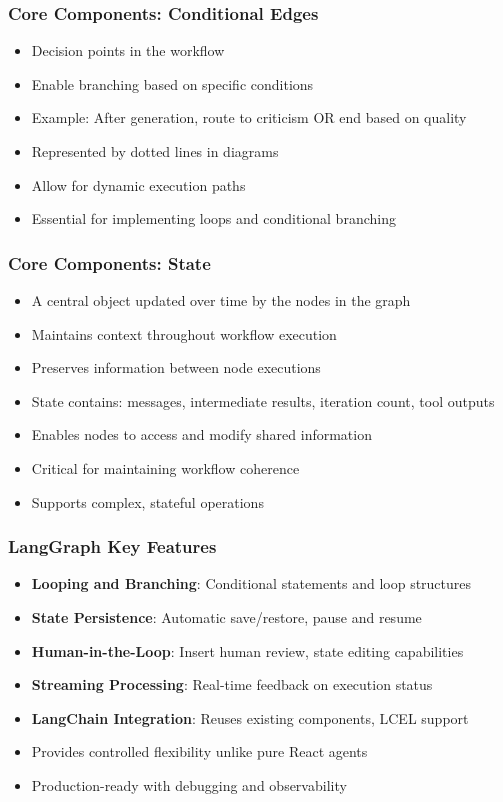 \begin{frame}[fragile]\frametitle{Core Components: Conditional Edges}
      \begin{itemize}
        \item Decision points in the workflow
        \item Enable branching based on specific conditions
        \item Example: After generation, route to criticism OR end based on quality
        \item Represented by dotted lines in diagrams
        \item Allow for dynamic execution paths
        \item Essential for implementing loops and conditional branching
      \end{itemize}
\end{frame}

\begin{frame}[fragile]\frametitle{Core Components: State}
      \begin{itemize}
	    \item A central object updated over time by the nodes in the graph
        \item Maintains context throughout workflow execution
        \item Preserves information between node executions
        \item State contains: messages, intermediate results, iteration count, tool outputs
        \item Enables nodes to access and modify shared information
        \item Critical for maintaining workflow coherence
        \item Supports complex, stateful operations
      \end{itemize}
\end{frame}


\begin{frame}[fragile]\frametitle{LangGraph Key Features}
      \begin{itemize}
        \item \textbf{Looping and Branching}: Conditional statements and loop structures
        \item \textbf{State Persistence}: Automatic save/restore, pause and resume
        \item \textbf{Human-in-the-Loop}: Insert human review, state editing capabilities
        \item \textbf{Streaming Processing}: Real-time feedback on execution status
        \item \textbf{LangChain Integration}: Reuses existing components, LCEL support
        \item Provides controlled flexibility unlike pure React agents
        \item Production-ready with debugging and observability
      \end{itemize}
\end{frame}

